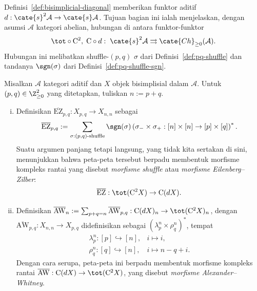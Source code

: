 
Definisi~\ref{def:bisimplicial-diagonal} memberikan funktor aditif
$d:\cate{s}^2\mathcal{A}\to\cate{s}\mathcal{A}$. Tujuan bagian ini ialah
menjelaskan, dengan asumsi $\mathcal{A}$ kategori abelian, hubungan di antara
funktor-funktor
\[ \tot \circ \mathrm{C}^2 , \; \mathrm{C} \circ d: \; \cate{s}^2 \mathcal{A} \rightrightarrows \cate{Ch}_{\geq 0}(\mathcal{A}). \]
Hubungan ini melibatkan shuffle-$(p,q)$ $\sigma$ dari
Definisi~\ref{def:pq-shuffle} dan tandanya $\sgn(\sigma)$ dari
Definisi~\ref{def:pq-shuffle-sgn}.

\begin{definition}\label{def:Eilenberg-Zilber}
	Misalkan $\mathcal{A}$ kategori aditif dan $X$ objek bisimplisial dalam
	$\mathcal{A}$. Untuk $(p,q)\in\Z_{\geq0}^2$ yang ditetapkan, tuliskan
	$n:=p+q$.
	\begin{enumerate}[(i)]
		\item Definisikan $\overline{\mathrm{EZ}}_{p,q}:X_{p,q}\to X_{n,n}$
		sebagai
		\[ \overline{\mathrm{EZ}}_{p, q} := \sum_{\sigma: (p,q)\text{-shuffle}}
			\sgn(\sigma) \left( \sigma_- \times \sigma_+ : [n] \times [n] \to [p] \times [q] \right)^*. \]
		Suatu argumen panjang tetapi langsung, yang tidak kita sertakan di sini,
		menunjukkan bahwa peta-peta tersebut berpadu membentuk
		morfisme kompleks rantai yang disebut \emph{morfisme shuffle} atau
		\emph{morfisme Eilenberg--Zilber}:
		\[ \overline{\mathrm{EZ}}: \tot(\mathrm{C}^2 X) \to \mathrm{C}(dX). \]
		\item Definisikan
		$\overline{\mathrm{AW}}_n:=\sum_{p+q=n}\overline{\mathrm{AW}}_{p,q}:
		\mathrm{C}(dX)_n\to\tot(\mathrm{C}^2X)_n$, dengan
		$\overline{\mathrm{AW}}_{p,q}:X_{n,n}\to X_{p,q}$ didefinisikan
		sebagai $(\lambda^n_p\times\rho^n_q)^*$, tempat
		\[\begin{array}{rl}
			\lambda^n_p: [p] \hookrightarrow [n], & i \mapsto i, \\
			\rho^n_q: [q] \hookrightarrow [n], & i \mapsto n - q + i.
		\end{array}\]
		Dengan cara serupa, peta-peta ini berpadu membentuk morfisme
		kompleks rantai
		$\overline{\mathrm{AW}}:\mathrm{C}(dX)\to\tot(\mathrm{C}^2X)$,
		yang disebut \emph{morfisme Alexander--Whitney}.
	\end{enumerate}
\end{definition}

